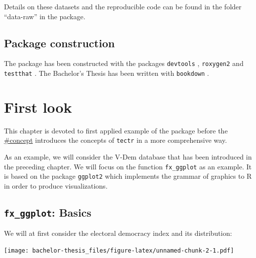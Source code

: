 \documentclass[]{report}
\newenvironment{Shaded}{\begin{snugshade}}{\end{snugshade}}
\newcommand{\KeywordTok}[1]{\textcolor[rgb]{0.13,0.29,0.53}{\textbf{#1}}}
\newcommand{\DataTypeTok}[1]{\textcolor[rgb]{0.13,0.29,0.53}{#1}}
\newcommand{\StringTok}[1]{\textcolor[rgb]{0.31,0.60,0.02}{#1}}
\newcommand{\OperatorTok}[1]{\textcolor[rgb]{0.81,0.36,0.00}{\textbf{#1}}}
\newcommand{\NormalTok}[1]{#1}
\theoremstyle{definition}
\theoremstyle{definition}
\theoremstyle{definition}
\theoremstyle{remark}
\begin{document}
Details on these datasets and the reproducible code can be found in the
folder ``data-raw'' in the package.

\section{Package construction}\label{package-construction}

The package has been constructed with the packages \texttt{devtools}
\citep{devtools}, \texttt{roxygen2} \citep{roxygen2} and
\texttt{testthat} \citep{testthat}. The Bachelor's Thesis has been
written with \texttt{bookdown} \citep[\citet{bookdown-2}]{bookdown-1}.

\chapter{First look}\label{first-look}

This chapter is devoted to first applied example of the package before
the \href{fourth\%20chapter}{\#concept} introduces the concepts of
\texttt{tectr} in a more comprehensive way.

As an example, we will consider the V-Dem database that has been
introduced in the preceding chapter. We will focus on the function
\texttt{fx\_ggplot} as an example. It is based on the package
\texttt{ggplot2} which implements the grammar of graphics to R in order
to produce visualizations. \citep{ggplot}

\section{\texorpdfstring{\texttt{fx\_ggplot}:
Basics}{fx\_ggplot: Basics}}\label{fx_ggplot-basics}

We will at first consider the electoral democracy index and its
distribution:

\begin{Shaded}
\end{Shaded}

\texttt{[image: bachelor-thesis\_files/figure-latex/unnamed-chunk-2-1.pdf]}
\end{document}
